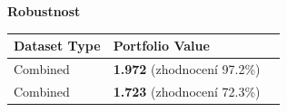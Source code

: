 \begin{frame}
\begin{table}
{%
        }
        \label{tab:datasets-comparison}
    \end{table}
    \textbf{Robustnost}
    \begin{table}[H]
        \centering
        {\footnotesize
            \begin{tabular}{|l|l|l|}
                \hline
                \textbf{Dataset Type} & \textbf{Portfolio Value}                                       \\ \hline
                Combined              & \textcolor[RGB]{50,150,50}{\textbf{1.972} (zhodnocení 97.2\%)} \\ \hline
                Combined              & \textcolor[RGB]{150,50,50}{\textbf{1.723} (zhodnocení 72.3\%)} \\ \hline
            \end{tabular}

        }
    \end{table}
\end{frame}

